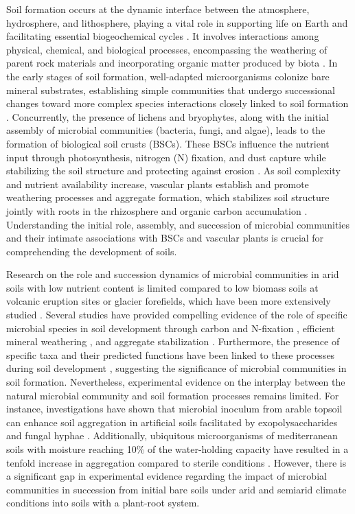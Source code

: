 Soil formation occurs at the dynamic interface between the atmosphere, hydrosphere, and lithosphere, playing a vital role in supporting life on Earth and facilitating essential biogeochemical cycles \citep{Amundson2007}. It involves interactions among physical, chemical, and biological processes, encompassing the weathering of parent rock materials and incorporating organic matter produced by biota \citep{Schulz2013}. In the early stages of soil formation, well-adapted microorganisms colonize bare mineral substrates, establishing simple communities that undergo successional changes toward more complex species interactions closely linked to soil formation \citep{Bajerski2013, Schulz2013, Liu2019, Li2021, Yu2022}. Concurrently, the presence of lichens and bryophytes, along with the initial assembly of microbial communities (bacteria, fungi, and algae), leads to the formation of biological soil crusts (BSCs). These BSCs influence the nutrient input through photosynthesis, nitrogen (N) fixation, and dust capture \citep{Elbert2012} while stabilizing the soil structure and protecting against erosion \citep{Seitz2017, RiverasMunoz2022}. As soil complexity and nutrient availability increase, vascular plants establish and promote weathering processes \citep{Calvaruso2009} and aggregate formation, which stabilizes soil structure jointly with roots in the rhizosphere and organic carbon accumulation \citep{Erktan2016, Baumert2018}. Understanding the initial role, assembly, and succession of microbial communities and their intimate associations with BSCs and vascular plants is crucial for comprehending the development of soils.

Research on the role and succession dynamics of microbial communities in arid soils with low nutrient content is limited compared to low biomass soils at volcanic eruption sites or glacier forefields, which have been more extensively studied \citep{Bajerski2013, Kelly2014, Meier2019, Hernandez2020}. Several studies have provided compelling evidence of the role of specific microbial species in soil development through carbon and N-fixation \citep{Schmidt2008, Duc2009}, efficient mineral weathering \citep{Frey2010, Lapanje2012}, and aggregate stabilization \citep{Kohler2006}. Furthermore, the presence of specific taxa and their predicted functions have been linked to these processes during soil development \citep{Zhelezova2019, Krauze2021, Rodriguez2022}, suggesting the significance of microbial communities in soil formation. Nevertheless, experimental evidence on the interplay between the natural microbial community and soil formation processes remains limited. For instance, investigations have shown that microbial inoculum from arable topsoil can enhance soil aggregation in artificial soils facilitated by exopolysaccharides and fungal hyphae \citep{Pronk2012}. Additionally, ubiquitous microorganisms of mediterranean soils with moisture reaching 10\% of the water-holding capacity have resulted in a tenfold increase in aggregation compared to sterile conditions \citep{Blankinship2016}. However, there is a significant gap in experimental evidence regarding the impact of microbial communities in succession from initial bare soils under arid and semiarid climate conditions into soils with a plant-root system.

